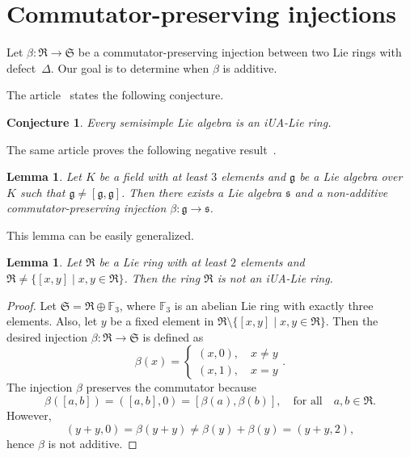 \documentclass[a4paper,reqno,12pt]{amsart}
\newtheorem{conjecture}[proposition]{Conjecture}
\newtheorem{lemma}[proposition]{Lemma}
\theoremstyle{definition}
\theoremstyle{remark}
\def\FF{{\mathbb F}}
\def\RRR{\mathfrak{R}}
\def\SSS{\mathfrak{S}}
\def\ggg{\mathfrak{g}}
\def\sss{\mathfrak{s}}
\begin{document}
	\section{Commutator-preserving injections}
	\label{sec4}

	Let $\beta : \RRR \rightarrow \SSS$ be a commutator-preserving injection between two Lie rings with defect~$\Delta$. Our goal is to determine when $\beta$ is additive.

	The article~\cite{arzhantsev2025uniqueness} states the following conjecture.

	\begin{conjecture}\label{conjecture:injectiveMaps}
		Every semisimple Lie algebra is an iUA-Lie ring.
	\end{conjecture}

	The same article proves the following negative result~\cite[Lemma~9]{arzhantsev2025uniqueness}.

	\begin{lemma}
		Let $K$ be a field with at least $3$ elements and $\ggg$ be a Lie algebra over $K$ such that $\ggg \neq [\ggg, \ggg]$. Then there exists a Lie algebra $\sss$ and a non-additive commutator-preserving injection $\beta : \ggg \rightarrow \sss$.
	\end{lemma}

	This lemma can be easily generalized.

	\begin{lemma}
		Let $\RRR$ be a Lie ring with at least $2$ elements and $\RRR \neq \lbrace [x, y] \mid x, y \in \RRR \rbrace$. Then the ring $\RRR$ is not an iUA-Lie ring.
	\end{lemma}

	\begin{proof}
		Let $\SSS = \RRR \oplus \FF_3$, where $\FF_3$ is an abelian Lie ring with exactly three elements. Also, let $y$ be a fixed element in $\RRR \setminus \lbrace [x, y] \mid x, y \in \RRR \rbrace$. Then the desired injection $\beta : \RRR \rightarrow \SSS$ is defined as
		\begin{equation*}
			\beta(x) = 
			\begin{cases}
				(x, 0), \quad x \neq y \\
				(x, 1), \quad x = y
			\end{cases}.
		\end{equation*}
		The injection $\beta$ preserves the commutator because
		\begin{equation*}
			\beta([a, b]) = ([a, b], 0) = [\beta(a), \beta(b)], \quad \text{for all} \quad a, b \in \RRR.
		\end{equation*}
		However,
		\begin{equation*}
			(y + y, 0) = \beta(y + y) \neq \beta(y) + \beta(y) = (y + y, 2),
		\end{equation*}
		hence $\beta$ is not additive.
	\end{proof}
\end{document}
